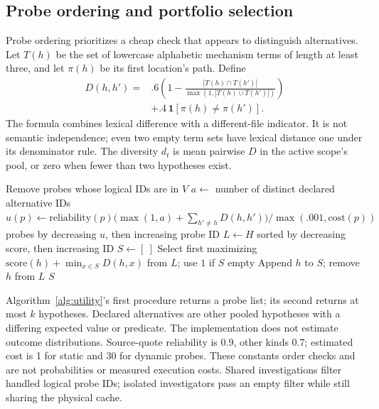 \documentclass[letterpaper,journal]{IEEEtran}
\begin{document}
\subsection{Probe ordering and portfolio selection}\label{sec:utility}
Probe ordering prioritizes a cheap check that appears to distinguish alternatives. Let $T(h)$ be the set of lowercase alphabetic mechanism terms of length at least three, and let $\pi(h)$ be its first location's path. Define
\begin{equation}\label{eq:distance}
\begin{aligned}
D(h,h')={}&.6\left(1-\frac{|T(h)\cap T(h')|}{\max(1,|T(h)\cup T(h')|)}\right)
\\ &+.4\,\mathbf{1}[\pi(h)\ne\pi(h')].
\end{aligned}
\end{equation}
The formula combines lexical difference with a different-file indicator. It is not semantic independence; even two empty term sets have lexical distance one under its denominator rule. The diversity $d_t$ is mean pairwise $D$ in the active scope's pool, or zero when fewer than two hypotheses exist.

\begin{algorithm}[t]
\caption{Probe ordering and portfolio selection}\label{alg:utility}
\begin{algorithmic}[1]\small
{}
  \State Remove probes whose logical IDs are in $V$
    \State $a\gets$ number of distinct declared alternative IDs
    \State $u(p)\gets \mathrm{reliability}(p)\bigl(\max(1,a)+\sum_{h'\ne h}D(h,h')\bigr)/\max(.001,\mathrm{cost}(p))$
  \EndFor
  \State \Return probes by decreasing $u$, then increasing probe ID
\EndProcedure
{}
  \State $L\gets H$ sorted by decreasing score, then increasing ID
  \State $S\gets[\ ]$
    \State Select first maximizing $\mathrm{score}(h)+\min_{x\in S}D(h,x)$ from $L$; use $1$ if $S$ empty
    \State Append $h$ to $S$; remove $h$ from $L$
  \EndWhile
  \State \Return $S$
\EndProcedure
\end{algorithmic}
\end{algorithm}

Algorithm~\ref{alg:utility}'s first procedure returns a probe list; its second returns at most $k$ hypotheses. Declared alternatives are other pooled hypotheses with a differing expected value or predicate. The implementation does not estimate outcome distributions. Source-quote reliability is 0.9, other kinds 0.7; estimated cost is 1 for static and 30 for dynamic probes. These constants order checks and are not probabilities or measured execution costs. Shared investigations filter handled logical probe IDs; isolated investigators pass an empty filter while still sharing the physical cache.
\end{document}
